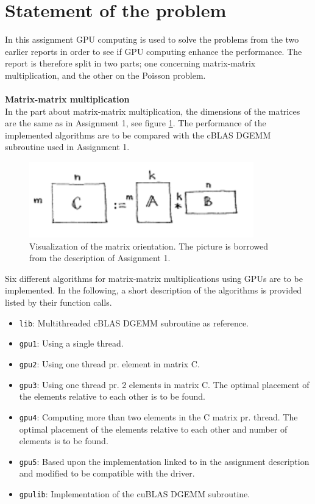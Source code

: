 \section{Statement of the problem}
In this assignment GPU computing is used to solve the problems from the two earlier reports in order to see if GPU computing enhance the performance. The report is therefore split in two parts; one concerning matrix-matrix multiplication, and the other on the Poisson problem. \\ \ \\
\textbf{Matrix-matrix multiplication}\\
In the part about matrix-matrix multiplication, the dimensions of the matrices are the same as in Assignment 1, see figure \ref{fig:mat_or}. The performance of the implemented algorithms are to be compared with the cBLAS DGEMM subroutine used in Assignment 1. \\
\begin{figure}[H]
    \centering
    \includegraphics{contents/pics_1/matmult.PNG}
    \caption{Visualization of the matrix orientation. The picture is borrowed from the description of Assignment 1.}
    \label{fig:mat_or}
\end{figure}
\noindent Six different algorithms for matrix-matrix multiplications using GPUs are to be implemented. In the following, a short description of the algorithms is provided listed by their function calls. 
\begin{itemize}
    \item \texttt{lib}: Multithreaded cBLAS DGEMM subroutine as reference.
    \item \texttt{gpu1}: Using a single thread. 
    \item \texttt{gpu2}: Using one thread pr. element in matrix C.
    \item \texttt{gpu3}: Using one thread pr. 2 elements in matrix C. The optimal placement of the elements relative to each other is to be found.
    \item \texttt{gpu4}: Computing more than two elements in the C matrix pr. thread. The optimal placement of the elements relative to each other and number of elements is to be found.
    \item \texttt{gpu5}: Based upon the implementation linked to in the assignment description and modified to be compatible with the driver.
    \item \texttt{gpulib}: Implementation of the cuBLAS DGEMM subroutine.
\end{itemize} \ \\
